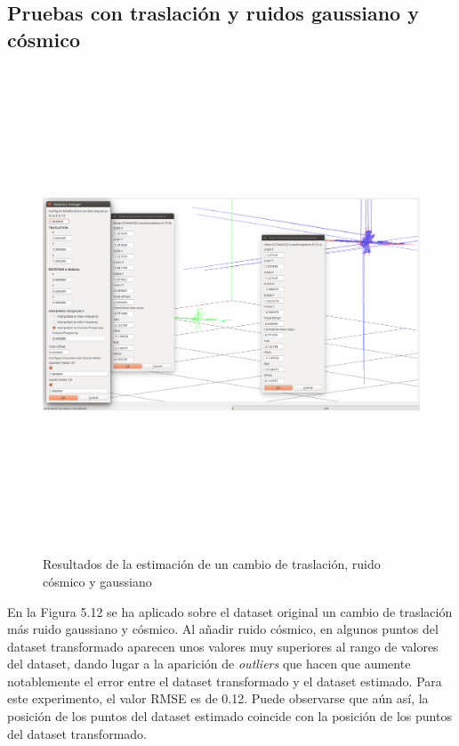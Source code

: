 \subsection{Pruebas con traslación y ruidos gaussiano y cósmico}
\begin{figure}[H]
\begin{center}
\label{fig:opciones de View}\includegraphics[height=14.0cm,width=18.0cm]{img/cap6/Trasla_GaussianCosmicNoise_abba.png}
\hspace{0.5cm}

\end{center}

\caption{Resultados de la estimación de un cambio de traslación, ruido cósmico y gaussiano}
\end{figure}

En la Figura 5.12 se ha aplicado sobre el dataset original un cambio de traslación más ruido gaussiano y cósmico. Al añadir ruido cósmico, en algunos puntos del dataset transformado aparecen unos valores muy superiores al rango de valores del dataset, dando lugar a la aparición de \textit{outliers} que hacen que aumente notablemente el error entre el dataset transformado y el dataset estimado. Para este experimento, el valor RMSE es de 0.12. Puede observarse que aún así, la posición de los puntos del dataset estimado coincide con la posición de los puntos del dataset transformado.


